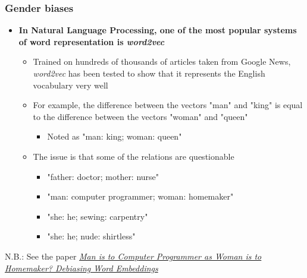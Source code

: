 \documentclass{beamer}
\begin{document}
\begin{frame}\frametitle{Gender biases}
\begin{itemize}
	\setlength\itemsep{1em}
	\item {\bf In Natural Language Processing, one of the most popular systems of word representation is \textit{word2vec}}
	\begin{itemize}
		\item Trained on hundreds of thousands of articles taken from Google News, \textit{word2vec} has been tested to show that it represents the English vocabulary very well
		\item For example, the difference between the vectors "man" and "king" is equal to the difference between the vectors "woman" and "queen"
		\begin{itemize}
			\item Noted as "man: king; woman: queen"
		\end{itemize}
		\item The issue is that some of the relations are questionable
		\begin{itemize}
			\item "father: doctor; mother: nurse"
			\item "man: computer programmer; woman: homemaker"
			\item "she: he; sewing: carpentry"
			\item "she: he; nude: shirtless"
		\end{itemize}
	\end{itemize}
\end{itemize}
N.B.: See the paper \textit{\href{https://arxiv.org/abs/1607.06520}{Man is to Computer Programmer as Woman is to Homemaker? Debiasing Word Embeddings}}
\end{frame}
\end{document}
